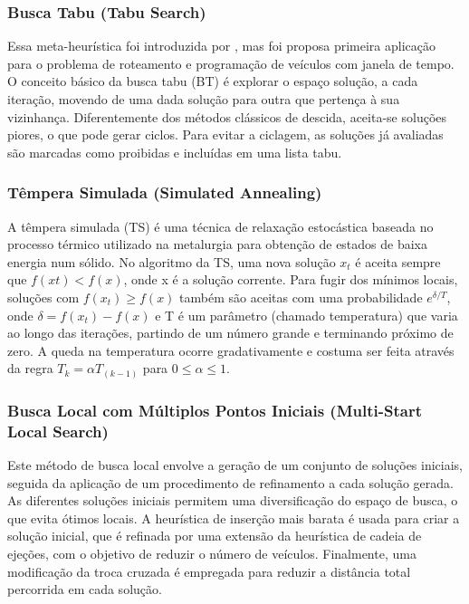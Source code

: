 \subsubsection{Busca Tabu (Tabu Search)}

Essa meta-heurística foi introduzida por \cite{Glover}, mas foi \cite{Garcia} proposa primeira aplicação para o problema de roteamento e programação de veículos com janela de tempo. O conceito básico da busca tabu (BT) é explorar o espaço solução, a cada iteração, movendo de uma dada solução para outra que pertença à sua vizinhança. Diferentemente dos métodos clássicos de descida, aceita-se soluções piores, o que pode gerar ciclos. Para evitar a ciclagem, as soluções já avaliadas são marcadas como proibidas e incluídas em uma lista tabu.

\subsubsection{Têmpera Simulada (Simulated Annealing)}

A têmpera simulada (TS) é uma técnica de relaxação estocástica baseada no processo térmico utilizado na metalurgia para obtenção de estados de baixa energia num sólido.  No algoritmo da TS,  uma nova solução \(x_t\) é aceita sempre que \(f(xt) < f(x)\), onde x é a solução corrente. Para fugir dos mínimos locais, soluções com \(f(x_t) \geq f(x)\) também são aceitas com uma probabilidade \(e^{\delta/T}\), onde \(\delta = f(x_t) - f(x)\) e T é um parâmetro (chamado temperatura) que varia ao longo das iterações, partindo de um número grande e terminando próximo de zero. A queda na temperatura ocorre gradativamente e costuma ser feita através da regra  \(T_k = \alpha T_(k-1)\) para \(0 \leq \alpha \leq 1\). \cite{Russell}

\subsubsection{Busca Local com Múltiplos Pontos Iniciais (Multi-Start Local Search)}

Este método de busca local envolve a geração de um conjunto de soluções iniciais, seguida da aplicação de um procedimento de refinamento a cada solução gerada. As diferentes soluções iniciais permitem uma diversificação do espaço de busca, o que evita ótimos locais. A heurística de inserção mais barata é usada para criar a solução inicial, que é refinada por uma extensão da heurística de cadeia de ejeções, com o objetivo de reduzir o número de veículos. Finalmente, uma modificação da troca cruzada é empregada para reduzir a distância total percorrida em cada solução. \cite{Dullaert}

